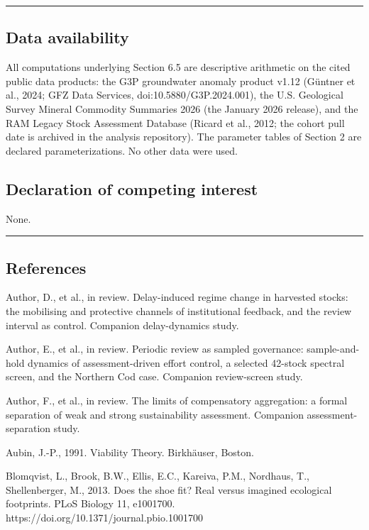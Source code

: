 \documentclass[11pt]{article}
\begin{document}
\begin{center}\rule{0.5\linewidth}{0.5pt}\end{center}

\subsection{Data availability}\label{data-availability}

All computations underlying Section 6.5 are descriptive arithmetic on
the cited public data products: the G3P groundwater anomaly product
v1.12 (G\"untner et al., 2024; GFZ Data Services,
doi:10.5880/G3P.2024.001), the U.S. Geological Survey Mineral Commodity
Summaries 2026 (the January 2026 release), and the RAM Legacy Stock
Assessment Database (Ricard et al., 2012; the cohort pull date is
archived in the analysis repository). The parameter tables of Section 2
are declared parameterizations. No other data were used.

\subsection{Declaration of competing
interest}\label{declaration-of-competing-interest}

None.

\begin{center}\rule{0.5\linewidth}{0.5pt}\end{center}

\subsection{References}\label{references}

Author, D., et al., in review. Delay-induced regime change in harvested
stocks: the mobilising and protective channels of institutional
feedback, and the review interval as control. Companion delay-dynamics
study.

Author, E., et al., in review. Periodic review as sampled governance:
sample-and-hold dynamics of assessment-driven effort control, a selected
42-stock spectral screen, and the Northern Cod case. Companion
review-screen study.

Author, F., et al., in review. The limits of compensatory aggregation: a
formal separation of weak and strong sustainability assessment.
Companion assessment-separation study.

Aubin, J.-P., 1991. Viability Theory. Birkh\"auser, Boston.

Blomqvist, L., Brook, B.W., Ellis, E.C., Kareiva, P.M., Nordhaus, T.,
Shellenberger, M., 2013. Does the shoe fit? Real versus imagined
ecological footprints. PLoS Biology 11, e1001700.
https://doi.org/10.1371/journal.pbio.1001700
\end{document}
